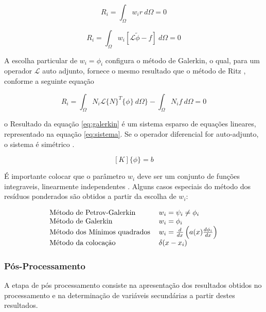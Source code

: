 \documentclass[
    12pt,               %
    openright,          %
    oneside,
    a4paper,            %
    english,            %
    french,             %
    spanish,            %
    brazil              %
    ]{abntex2}
\begin{document}
  \begin{equation}
    \label{eq:res1}
    R_i = \int_{\Omega}{w_i r \ d\Omega} = 0
  \end{equation}
  
  \begin{equation}
    \label{eq:res2}
    R_i = \int_{\Omega}{w_i [\mathcal{L} \tilde{\phi} - f] \ d\Omega} = 0
  \end{equation}  


A escolha particular de $w_i = \phi_i$ configura o método de Galerkin, o qual, para um operador $\mathcal{L}$ auto adjunto, fornece o mesmo resultado que o método de Ritz  \cite[p. 22]{jin}, conforme a seguinte equação

  \begin{equation}
    \label{eq:galerkin}
    R_i = 
    \int_{\Omega}{N_i \mathcal{L} \{N\}^T \{\phi\} \ d\Omega\}} - \int_{\Omega}{N_i f \ d \Omega} = 0
  \end{equation}  
  
  
  o Resultado da equação \ref{eq:galerkin} é um sistema esparso de equações lineares, representado na equação \ref{eq:sistema}. Se o operador diferencial for auto-adjunto, o sistema é simétrico \cite[p. 36]{volakis}.
  
    \begin{equation}
        \label{eq:sistema}
        [K]\{\phi\} = {b}
    \end{equation}  

É importante colocar que o parâmetro $w_i$ deve ser um conjunto de funções integraveis, linearmente independentes
\cite[p. 60]{reddy}. Alguns casos especiais do método dos resíduos ponderados são obtidos a partir da escolha de $w_i$:

\begin{equation}
\label{eq:metPond}
    \begin{tabular}{ l l }
    Método de Petrov-Galerkin & $ w_i = \psi_i \neq \phi_i $ \\ 
    Método de Galerkin & $ w_i = \phi_i $\\  
    Método dos Mínimos quadrados & $ w_i = \frac{d}{dx} \left(a(x)\frac{d \phi_i}{dx}\right) $ \\ 
    Método da colocação & $ \delta(x - x_i)  $ 
    \end{tabular}
\end{equation}





\subsubsection{Pós-Processamento}
A etapa de pós processamento consiste na apresentação dos resultados obtidos no processamento e na determinação de variáveis secundárias a partir destes resultados.
\end{document}
